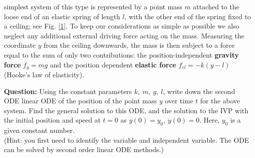 \documentclass[11pt,a4paper,twoside]{article}
\begin{document}
	simplest system of this type is represented by a point mass $m$ attached to the loose end of an elastic spring of length $l$, with the other end of the spring fixed to a ceiling; see Fig. \ref{1}. To keep our considerations as simple as possible we also neglect any additional external driving force acting on the mass. Measuring the coordinate $y$ from the ceiling downwards, the mass is then subject to a force equal to the sum of only two contributions: the position-independent \textbf{gravity force} $f_g = mg$ and the position dependent \textbf{elastic force} $f_{el} = -k(y-l)$ (Hooke’s law of elasticity).\par
	\textbf{Question:} Using the constant parameters $k,\ m,\ g,\ l$, write down the second ODE linear ODE of the position of the point mass $y$ over time $t$ for the above system. Find the general solution to this ODE, and the solution to the IVP with the initial position and speed at $t = 0$ as $y(0) = y_0,\ \dot{y}(0) = 0$. Here, $y_0$ is a given constant number.\\
	(Hint: you first need to identify the variable and independent variable. The ODE can be solved by second order linear ODE methods.)
\end{document}
